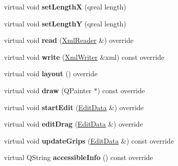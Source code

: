 \begin{DoxyCompactItemize}
\item 
\mbox{\label{class_ms_1_1_chord_line_acc2644f1a7769597eb69891698f3a52a}} 
virtual void {\bfseries set\+LengthX} (qreal length)
\item 
\mbox{\label{class_ms_1_1_chord_line_a25fc68842c9dea4baaedc53be4badd60}} 
virtual void {\bfseries set\+LengthY} (qreal length)
\item 
\mbox{\label{class_ms_1_1_chord_line_a994a352fdc212032d2f31c32243ef78d}} 
virtual void {\bfseries read} (\hyperlink{class_ms_1_1_xml_reader}{Xml\+Reader} \&) override
\item 
\mbox{\label{class_ms_1_1_chord_line_a1677443047d1b7c4bc6548a8546e8d29}} 
virtual void {\bfseries write} (\hyperlink{class_ms_1_1_xml_writer}{Xml\+Writer} \&xml) const override
\item 
\mbox{\label{class_ms_1_1_chord_line_ae7563a6af01f7b93c7f6524127d068d4}} 
virtual void {\bfseries layout} () override
\item 
\mbox{\label{class_ms_1_1_chord_line_a69d4f86df8cee6dc81e3ab804ee5e0eb}} 
virtual void {\bfseries draw} (Q\+Painter $\ast$) const override
\item 
\mbox{\label{class_ms_1_1_chord_line_a866d56d10627f75fa0a4abbde2f2bbca}} 
virtual void {\bfseries start\+Edit} (\hyperlink{class_ms_1_1_edit_data}{Edit\+Data} \&) override
\item 
\mbox{\label{class_ms_1_1_chord_line_af17e3d31885af998570e431714937e5d}} 
virtual void {\bfseries edit\+Drag} (\hyperlink{class_ms_1_1_edit_data}{Edit\+Data} \&) override
\item 
\mbox{\label{class_ms_1_1_chord_line_a9fe164c9212cea5bdd8dc549e8d0faf0}} 
virtual void {\bfseries update\+Grips} (\hyperlink{class_ms_1_1_edit_data}{Edit\+Data} \&) const override
\item 
\mbox{\label{class_ms_1_1_chord_line_a24864a6bc0a0e5989239c33caf727533}} 
virtual Q\+String {\bfseries accessible\+Info} () const override
\end{DoxyCompactItemize}
